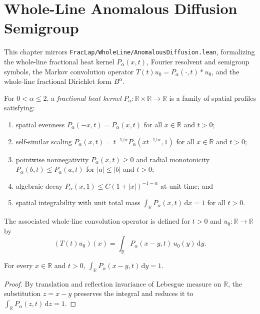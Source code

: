 \chapter{Whole-Line Anomalous Diffusion Semigroup}

This chapter mirrors \texttt{FracLap/WholeLine/AnomalousDiffusion.lean}, formalizing the whole-line fractional heat kernel $P_\alpha(x, t)$, Fourier resolvent and semigroup symbols, the Markov convolution operator $T(t) u_0 = P_\alpha(\cdot, t) * u_0$, and the whole-line fractional Dirichlet form $B^\alpha$.

\begin{definition}\label{def:fractional_heat_kernel}
\leanok
For $0 < \alpha \le 2$, a \emph{fractional heat kernel} $P_\alpha : \mathbb{R} \times \mathbb{R} \to \mathbb{R}$ is a family of spatial profiles satisfying:
\begin{enumerate}
  \item spatial evenness $P_\alpha(-x, t) = P_\alpha(x, t)$ for all $x \in \mathbb{R}$ and $t > 0$;
  \item self-similar scaling $P_\alpha(x, t) = t^{-1/\alpha} P_\alpha(x t^{-1/\alpha}, 1)$ for all $x \in \mathbb{R}$ and $t > 0$;
  \item pointwise nonnegativity $P_\alpha(x, t) \ge 0$ and radial monotonicity $P_\alpha(b, t) \le P_\alpha(a, t)$ for $\lvert a \rvert \le \lvert b \rvert$ and $t > 0$;
  \item algebraic decay $P_\alpha(x, 1) \le C (1 + \lvert x \rvert)^{-1-\alpha}$ at unit time; and
  \item spatial integrability with unit total mass $\int_{\mathbb{R}} P_\alpha(x, t)\, \mathrm{d}x = 1$ for all $t > 0$.
\end{enumerate}
The associated whole-line convolution operator is defined for $t > 0$ and $u_0 : \mathbb{R} \to \mathbb{R}$ by
\[
  (T(t) u_0)(x) = \int_{\mathbb{R}} P_\alpha(x - y, t)\, u_0(y)\, \mathrm{d}y.
\]
\end{definition}

\begin{lemma}\label{lem:kernel_integral_sub_eq_one}
\leanok
For every $x \in \mathbb{R}$ and $t > 0$, $\int_{\mathbb{R}} P_\alpha(x - y, t)\, \mathrm{d}y = 1$.
\end{lemma}

\begin{proof}
\leanok
By translation and reflection invariance of Lebesgue measure on $\mathbb{R}$, the substitution $z = x - y$ preserves the integral and reduces it to $\int_{\mathbb{R}} P_\alpha(z, t)\, \mathrm{d}z = 1$.
\end{proof}

